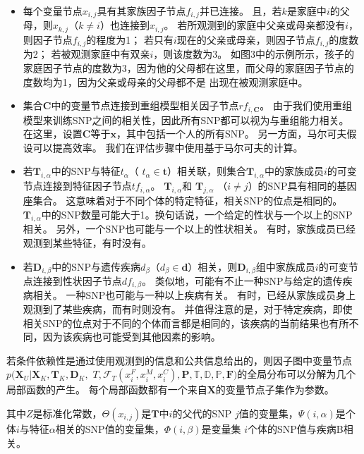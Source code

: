 \begin{itemize}
	\item 每个变量节点$x_{i,j}$具有其家族因子节点$f_{i,j}$并已连接。 且，若$k$是家庭中$i$的父母，则$x_{k,j}$（$ k \neq i$）也连接到$x_{i,j}$。 若所观测到的家庭中父亲或母亲都没有$i$，则因子节点$f_{i,j}$的程度为1； 若只有$i$现在的父亲或母亲，则因子节点$f_{i,j}$的度数为2； 若被观测家庭中有双亲$i$，则该度数为3。 如图3中的示例所示，孩子的家庭因子节点的度数为3，因为他的父母都在这里，而父母的家庭因子节点的度数均为1，因为父亲或母亲的父母都不是 出现在被观测家庭中。
	\item 集合$\mathbf{C}$中的变量节点连接到重组模型相关因子节点$rf_{i,\mathbf{C}}$。 由于我们使用重组模型来训练SNP之间的相关性，因此所有SNP都可以视为与重组能力相关。 在这里，设置$\mathbf{C}$等于$\mathbf{x}$，其中包括一个人的所有SNP。 另一方面，马尔可夫假设可以提高效率。 我们在评估步骤中使用基于马尔可夫的计算。
	\item 若$\mathbf{T}_{i,\alpha}$中的SNP与特征$t_{\alpha}$（ $t_{\alpha} \in \mathbf{t}$）相关联，则集合$\mathbf{T}_{i,\alpha}$中的家族成员$i$的可变节点连接到特征因子节点$tf_{i,\alpha}$。 $\mathbf{T}_{i,\alpha}$和 $\mathbf{T}_{j,\alpha}$ （$i \neq j$）的SNP具有相同的基因座集合。 这意味着对于不同个体的特定特征，相关SNP的位点是相同的。 $\mathbf{T}_{i,\alpha}$中的SNP数量可能大于1。换句话说，一个给定的性状与一个以上的SNP相关。 另外，一个SNP也可能与一个以上的性状相关。 有时，家族成员已经观测到某些特征，有时没有。
	\item 若$\mathbf{D}_{i,\beta}$中的SNP与遗传疾病$d_{\beta}$（$d_{\beta} \in \mathbf{d}$）相关，则$\mathbf{D}_{i,\beta}$组中家族成员$i$的可变节点连接到性状因子节点$df_{i,\beta}$。 类似地，可能有不止一种SNP与给定的遗传疾病相关。 一种SNP也可能与一种以上疾病有关。 有时，已经从家族成员身上观测到了某些疾病，而有时则没有。 并值得注意的是，对于特定疾病，即使相关SNP的位点对于不同的个体而言都是相同的，该疾病的当前结果也有所不同，因为该疾病也可能受到其他因素的影响。
	
\end{itemize}


若条件依赖性是通过使用观测到的信息和公共信息给出的，则因子图中变量节点$p(\mathbf{X}_U | \mathbf{X}_K, \mathbf{T}_K,\mathbf{D}_K,$ $T, \mathcal{F}_T(x_i^F, x_i^M, x_i^C), \mathbf{P}, \mathbb{T}, \mathbb{D}, \mathbb{P}, \mathbf{F})$的全局分布可以分解为几个局部函数的产生。 每个局部函数都有一个来自$\mathbf{X}$的变量节点子集作为参数。


其中$Z$是标准化常数，$\Theta(x_{i,j})$是$\mathbf{T}$中$i$的父代的SNP $j$值的变量集，$\Psi(i,\alpha)$是个体$i$与特征$\alpha$相关的SNP值的变量集，$\Phi(i,\beta)$是变量集 $i$个体的SNP值与疾病B相关。

